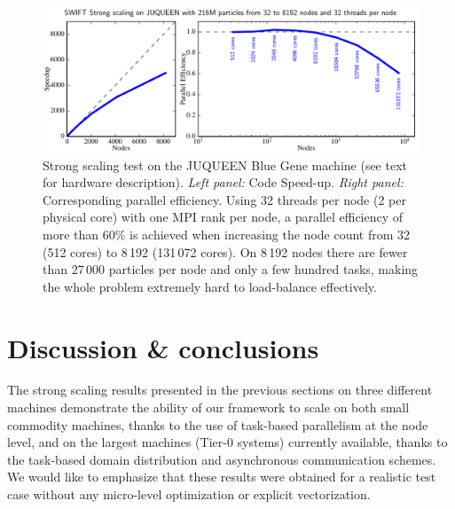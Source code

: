 \documentclass{sig-alternate-05-2015}
\begin{document}
\begin{figure}
\centering
\includegraphics[width=\textwidth]{Figures/scalingBlueGene}
\caption{Strong scaling test on the JUQUEEN Blue Gene machine (see text
  for hardware description). \textit{Left panel:} Code
  Speed-up. \textit{Right panel:} Corresponding parallel efficiency.
  Using 32 threads per node (2 per physical core) with one MPI rank
  per node, a parallel efficiency of more than $60\%$ is achieved when
  increasing the node count from 32 (512 cores) to 8\,192 (131\,072
  cores). On 8\,192 nodes there are fewer than 27\,000 particles per
  node and only a few hundred tasks, making the whole problem
  extremely hard to load-balance effectively.
  \label{fig:JUQUEEN2}}
\end{figure}






\section{Discussion \& conclusions}

The strong scaling results presented in the previous sections on
three different machines demonstrate the ability of our framework
to scale on both small commodity
machines, thanks to the use of task-based parallelism at the node level, and on
the largest machines (Tier-0 systems) currently available, thanks to the
task-based domain distribution and asynchronous communication schemes.
We would like to emphasize that these results were obtained for a
realistic test case without any micro-level optimization or explicit
vectorization.
\end{document}
